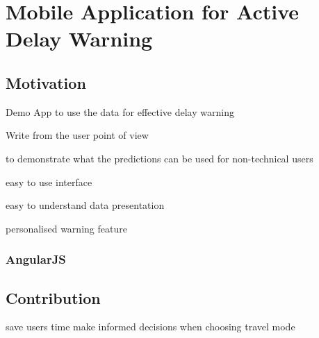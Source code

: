 \chapter{Mobile Application for Active Delay Warning}
\label{ch:mobile_app}
\section{Motivation}
\par Demo App to use the data for effective delay warning

\par Write from the user point of view

\par to demonstrate what the predictions can be used for non-technical users

\par easy to use interface
\par easy to understand data presentation

\par personalised warning feature


\subsection{AngularJS}

\section{Contribution}
save users time
make informed decisions when choosing travel mode
